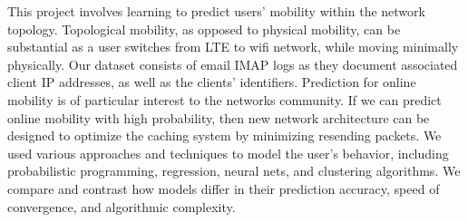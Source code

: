 % 
% 
%
This project involves learning to predict users' mobility within the network topology. Topological mobility, as opposed to physical mobility, can be substantial as a user switches from LTE to wifi network, while moving minimally physically. Our dataset consists of email IMAP logs as they document associated client IP addresses, as well as the clients' identifiers. Prediction for online mobility is of particular interest to the networks community. If we can predict online mobility with high probability, then new network architecture can be designed to optimize the caching system by minimizing resending packets.  We used various approaches and techniques to model the user's behavior, including probabilistic programming, regression, neural nets, and clustering algorithms. We compare and contrast how models differ in their prediction accuracy, speed of convergence, and algorithmic complexity. 
